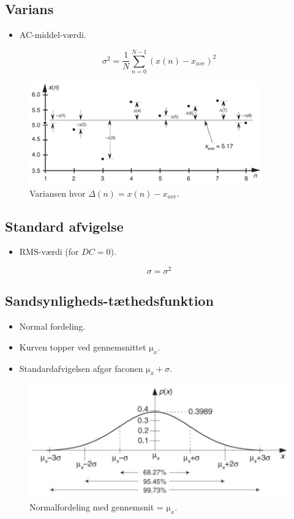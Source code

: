 \documentclass[danish]{article}
\begin{document}
\subsection{Varians}
\begin{itemize}
	\item AC-middel-værdi.
\end{itemize}

\begin{equation}
{\sigma}^2 = \frac{1}{N} \sum_{n=0}^{N-1}(x(n)-x_{ave})^2
\end{equation}

\begin{figure} [H]
	\centering
	\includegraphics[width=0.6\linewidth]{graphics/var}
	\caption{Variansen hvor $\Delta(n) = x(n)-x_{ave}$.}
	\label{fig:var}
\end{figure}

\subsection{Standard afvigelse}
\begin{itemize}
	\item RMS-værdi (for $DC=0$).
\end{itemize}

\begin{equation}
{\sigma} = {\sigma}^2
\end{equation}

\subsection{Sandsynligheds-tæthedsfunktion}
\begin{itemize}
	\item Normal fordeling.
	\item Kurven topper ved gennemsnittet $\si{\micro}_x$.
	\item Standardafvigelsen afgør faconen $\si{\micro}_x + \sigma$.
\end{itemize}

\begin{figure} [H]
	\centering
	\includegraphics[width=0.6\linewidth]{graphics/pdf}
	\caption{Normalfordeling med gennemsnit = $\si{\micro}_x$.}
	\label{fig:pdf}
\end{figure}
\end{document}
